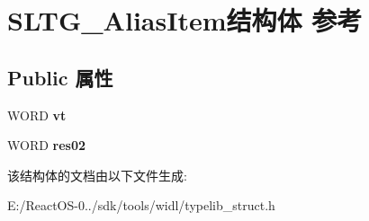 \hypertarget{struct_s_l_t_g___alias_item}{}\section{S\+L\+T\+G\+\_\+\+Alias\+Item结构体 参考}
\label{struct_s_l_t_g___alias_item}
\subsection*{Public 属性}
\begin{DoxyCompactItemize}
\item 
\mbox{\label{struct_s_l_t_g___alias_item_a3a25754db3db5ad881b19cb2189a55e2}} 
W\+O\+RD {\bfseries vt}
\item 
\mbox{\label{struct_s_l_t_g___alias_item_ab7285181a4face68816e1a495c697435}} 
W\+O\+RD {\bfseries res02}
\end{DoxyCompactItemize}


该结构体的文档由以下文件生成\+:\begin{DoxyCompactItemize}
\item 
E\+:/\+React\+O\+S-\/0../sdk/tools/widl/typelib\+\_\+struct.\+h\end{DoxyCompactItemize}
